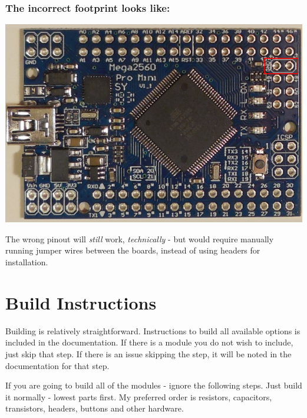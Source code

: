 \documentclass[11pt]{article}
\begin{document}
\subsubsection{The \textbf{incorrect} footprint looks like:}
\label{sec:org0f14868}
\begin{center}
\includegraphics[width=.9\linewidth]{../png/2.1/Wrong2560.png}
\end{center}

The wrong pinout will \emph{still} work, \emph{technically} - but would require manually running jumper wires between the boards, instead of using headers for installation.

\newpage
\section{Build Instructions}
\label{sec:org37f6a82}
Building is relatively straightforward.  Instructions to build all available options is included in the documentation.  If there is a module you do not wish to include, just skip that step.  If there is an issue skipping the step, it will be noted in the documentation for that step.

If you are going to build all of the modules - ignore the following steps.  Just build it normally - lowest parts first.  My preferred order is resistors, capacitors, transistors, headers, buttons and other hardware.
\end{document}
